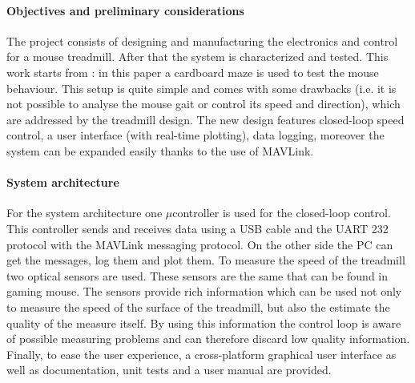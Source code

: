 \documentclass[12pt,a4paper]{article}
\begin{document}
\begin{multicols}{2}
[]

\paragraph{Objectives and preliminary considerations} 
\lfoot{\today}

The project consists of designing and manufacturing the electronics and control for a mouse treadmill. After that the system is characterized and tested. This work starts from \cite{Ole}: in this paper a cardboard maze is used to test the mouse behaviour. This setup is quite simple and comes with some drawbacks (i.e. it is not possible to analyse the mouse gait or control its speed and direction), which are addressed by the treadmill design. The new design features closed-loop speed control, a user interface (with real-time plotting), data logging, moreover the system can be expanded easily thanks to the use of MAVLink.

\paragraph{System architecture}
 For the system architecture one $\mu$controller is used for the closed-loop control. This controller sends and receives data using a USB cable and the UART 232 protocol with the MAVLink messaging protocol. On the other side the PC can get the messages, log them and plot them. To measure the speed of the treadmill two optical sensors are used. These sensors are the same that can be found in gaming mouse. The sensors provide rich information which can be used not only to measure the speed of the surface of the treadmill, but also the estimate the quality of the measure itself. By using this information the control loop is aware of possible measuring problems and can therefore discard low quality information.\\
 Finally, to ease the user experience, a cross-platform graphical user interface as well as documentation, unit tests and a user manual are provided. 
 

\end{multicols}
\end{document}

